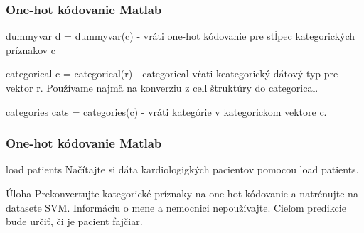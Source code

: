 \documentclass{beamer}
\begin{document}
\begin{frame}
\frametitle{One-hot kódovanie Matlab}
\begin{block}{dummyvar}
d = dummyvar(c) - vráti one-hot kódovanie pre stĺpec kategorických príznakov c
\end{block}

\begin{block}{categorical}
c = categorical(r) - categorical vŕati keategorický dátový typ pre vektor r. Používame najmä na konverziu z cell štruktúry do categorical.
\end{block}

\begin{block}{categories}
cats = categories(c) - vráti kategórie v kategorickom vektore c. 
\end{block}
\end{frame}

\begin{frame}
\frametitle{One-hot kódovanie Matlab}
\begin{block}{load patients}
Načítajte si dáta kardiologigkých pacientov pomocou load patients.
\end{block}

\begin{block}{Úloha}
Prekonvertujte kategorické príznaky na one-hot kódovanie a natrénujte na datasete SVM. Informáciu o mene a nemocnici nepoužívajte. Cieľom predikcie bude určiť, či je pacient fajčiar.
\end{block}
\end{frame}
\end{document}
